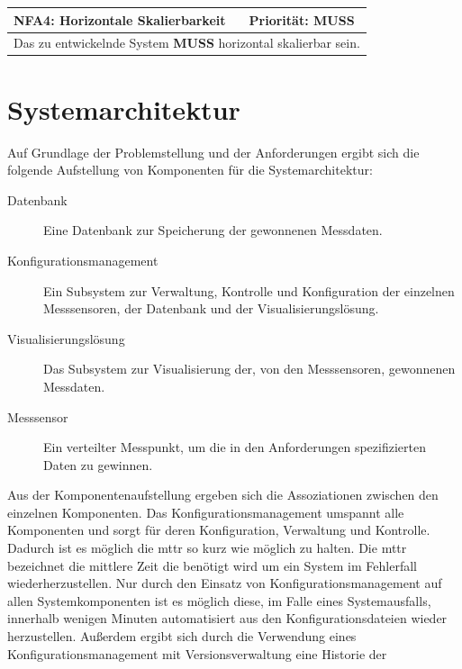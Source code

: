 \documentclass[titlepage]{report}
\begin{document}
\begin{center}
\begin{tabular}{p{}>{\raggedleft\arraybackslash}p{}}\toprule
    \textbf{NFA4: Horizontale Skalierbarkeit} & \textbf{Priorität: MUSS} \\\midrule
	\multicolumn{2}{p{\textwidth-\tabcolsep}}{%
        Das zu entwickelnde System \textbf{MUSS} horizontal skalierbar
        sein.
        }\\\bottomrule
\end{tabular}
    \label{table:NFA4}
\end{center}

\section{Systemarchitektur}
Auf Grundlage der Problemstellung und der Anforderungen ergibt sich die
folgende Aufstellung von Komponenten für die Systemarchitektur:
\begin{description}
    \item[Datenbank] Eine Datenbank zur Speicherung der
                     gewonnenen Messdaten.
    \item[Konfigurationsmanagement] Ein Subsystem zur Verwaltung, Kontrolle
        und Konfiguration der einzelnen Messsensoren, der Datenbank und
        der Visualisierungslösung.
    \item[Visualisierungslösung] Das Subsystem zur Visualisierung der, von
        den Messsensoren, gewonnenen Messdaten.
    \item[Messsensor] Ein verteilter Messpunkt, um die in den
        Anforderungen spezifizierten Daten zu gewinnen.
\end{description}
Aus der Komponentenaufstellung ergeben sich die Assoziationen zwischen
den einzelnen Komponenten. Das Konfigurationsmanagement umspannt alle
Komponenten und sorgt für deren Konfiguration, Verwaltung und Kontrolle.
Dadurch ist es möglich die \gls{mttr} so kurz wie möglich zu halten. Die
\gls{mttr} bezeichnet die mittlere Zeit die benötigt wird um ein System
im Fehlerfall wiederherzustellen\cite{MTTR}. Nur durch den Einsatz von
Konfigurationsmanagement auf allen Systemkomponenten ist es möglich
diese, im Falle eines Systemausfalls, innerhalb
wenigen Minuten automatisiert aus den Konfigurationsdateien wieder
herzustellen. Außerdem ergibt sich durch die Verwendung eines
Konfigurationsmanagement mit Versionsverwaltung eine Historie der
\end{document}
